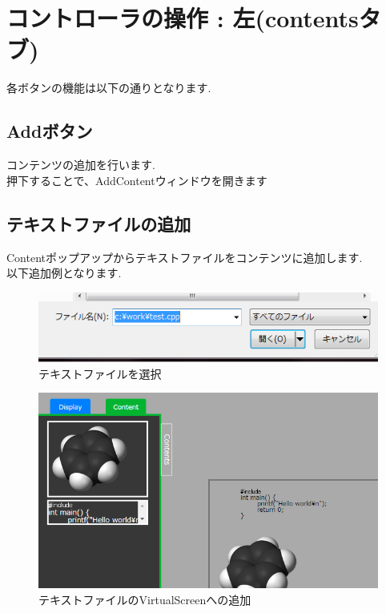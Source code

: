 \documentclass[a4paper,10pt,oneside]{jsbook}
\begin{document}
\section{コントローラの操作 : 左(contentsタブ)}
各ボタンの機能は以下の通りとなります.\\

\subsection{Addボタン}
コンテンツの追加を行います.\\
押下することで、AddContentウィンドウを開きます



\subsection{テキストファイルの追加}
Contentポップアップからテキストファイルをコンテンツに追加します.\\
以下追加例となります.\\

\begin{figure}[htbp]
	\begin{center}
		\includegraphics[width=11.5cm]{image/AddContent_TextFile_Select.png}
	\end{center}
	\caption{テキストファイルを選択}
	\label{fig:addtext}
\end{figure}


\begin{figure}[htbp]
	\begin{center}
		\includegraphics[width=15.5cm]{image/AddContent_TextFile_View.png}
	\end{center}
	\caption{テキストファイルのVirtualScreenへの追加}
	\label{fig:addtextfile}
\end{figure}
\end{document}
